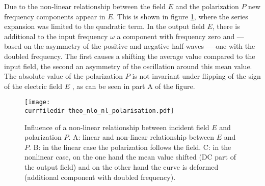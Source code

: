 Due to the non-linear relationship between the field $E$ and the
polarization $P$ new frequency components appear in $E$. This
is shown in  figure \ref{fig_shg_nonlinear_polarization},
where the series expansion was limited to the quadratic term. In the output field $E$, there is  additional to the 
input frequency $\omega$ a component with frequency zero and --- based on the asymmetry of the positive and negative half-waves ---
one with the doubled frequency. The first causes a
shifting the average value compared to the input field, the second
an asymmetry of the oscillation around this mean value. The absolute value of the polarization $P$ is not invariant under flipping of the  sign of the electric field $E$ , as can be seen in part A of the figure.


\begin{figure}
\center
\texttt{[image: \\currfiledir theo\_nlo\_nl\_polarisation.pdf]}
\caption{Influence of a non-linear relationship between
incident field $E$ and polarization $P$. A: linear and non-linear relationship
between $E$ and $P$. B: in the linear case the polarization follows
the field. C: in the nonlinear case, on the one hand the mean value
shifted (DC part of the output field) and on the other hand the
curve is deformed (additional component with doubled frequency).}
\label{fig_shg_nonlinear_polarization}
\end{figure}




